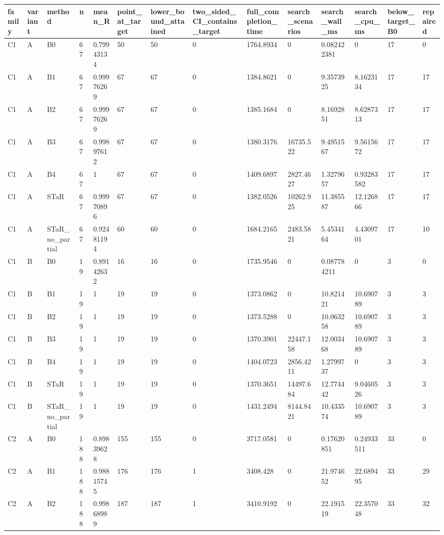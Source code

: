 \begin{longtable}{llllllllllllll}
\hline
family & variant & method & n & mean\_R & point\_at\_target & lower\_bound\_attained & two\_sided\_CI\_contains\_target & full\_completion\_time & search\_scenarios & search\_wall\_ms & search\_cpu\_ms & below\_target\_B0 & repaired \\
\hline
C1 & A & B0 & 67 & 0.79943134 & 50 & 50 & 0 & 1764.8934 & 0 & 0.082422381 & 0 & 17 & 0 \\
C1 & A & B1 & 67 & 0.99976269 & 67 & 67 & 0 & 1384.8621 & 0 & 9.3573925 & 8.1623134 & 17 & 17 \\
C1 & A & B2 & 67 & 0.99976269 & 67 & 67 & 0 & 1385.1684 & 0 & 8.1692851 & 8.6287313 & 17 & 17 \\
C1 & A & B3 & 67 & 0.99897612 & 67 & 67 & 0 & 1380.3176 & 16735.522 & 9.4951567 & 9.5615672 & 17 & 17 \\
C1 & A & B4 & 67 & 1 & 67 & 67 & 0 & 1409.6897 & 2827.4627 & 1.3279657 & 0.93283582 & 17 & 17 \\
C1 & A & STaR & 67 & 0.99970896 & 67 & 67 & 0 & 1382.0526 & 10262.925 & 11.385587 & 12.126866 & 17 & 17 \\
C1 & A & STaR\_no\_partial & 67 & 0.92481194 & 60 & 60 & 0 & 1684.2165 & 2483.5821 & 5.4534164 & 4.4309701 & 17 & 10 \\
C1 & B & B0 & 19 & 0.89142632 & 16 & 16 & 0 & 1735.9546 & 0 & 0.087784211 & 0 & 3 & 0 \\
C1 & B & B1 & 19 & 1 & 19 & 19 & 0 & 1373.0862 & 0 & 10.821421 & 10.690789 & 3 & 3 \\
C1 & B & B2 & 19 & 1 & 19 & 19 & 0 & 1373.5288 & 0 & 10.063258 & 10.690789 & 3 & 3 \\
C1 & B & B3 & 19 & 1 & 19 & 19 & 0 & 1370.3901 & 22447.158 & 12.003468 & 10.690789 & 3 & 3 \\
C1 & B & B4 & 19 & 1 & 19 & 19 & 0 & 1404.0723 & 2856.4211 & 1.2799737 & 0 & 3 & 3 \\
C1 & B & STaR & 19 & 1 & 19 & 19 & 0 & 1370.3651 & 14497.684 & 12.774442 & 9.0460526 & 3 & 3 \\
C1 & B & STaR\_no\_partial & 19 & 1 & 19 & 19 & 0 & 1431.2494 & 8144.8421 & 10.433574 & 10.690789 & 3 & 3 \\
C2 & A & B0 & 188 & 0.89839628 & 155 & 155 & 0 & 3717.0581 & 0 & 0.17620851 & 0.24933511 & 33 & 0 \\
C2 & A & B1 & 188 & 0.98815745 & 176 & 176 & 1 & 3408.428 & 0 & 21.974652 & 22.689495 & 33 & 29 \\
C2 & A & B2 & 188 & 0.99868989 & 187 & 187 & 1 & 3410.9192 & 0 & 22.191519 & 22.357048 & 33 & 32 \\

\end{longtable}
